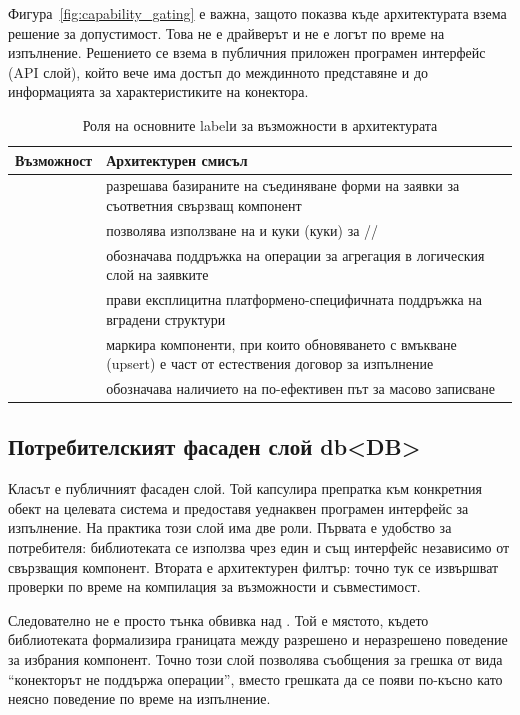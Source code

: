 Фигура~\ref{fig:capability_gating} е важна, защото показва къде архитектурата взема решение за допустимост. Това не е драйверът и не е логът по време на изпълнение. Решението се взема в публичния приложен програмен интерфейс (API слой), който вече има достъп до междинното представяне и до информацията за характеристиките на конектора.

\begin{table}[H]
\centering
\small
\caption{Роля на основните labelи за възможности в архитектурата}
\label{tab:capability_tags}
\begin{tabularx}{\textwidth}{L{3.6cm}Y}
\toprule
\textbf{Възможност} & \textbf{Архитектурен смисъл} \\
\midrule
{} & разрешава базираните на съединяване форми на заявки за съответния свързващ компонент \\
 & позволява използване на  и куки (куки) за // \\
 & обозначава поддръжка на операции за агрегация в логическия слой на заявките \\
 & прави експлицитна платформено-специфичната поддръжка на вградени структури \\
 & маркира компоненти, при които обновяването с вмъкване (upsert) е част от естествения договор за изпълнение \\
 & обозначава наличието на по-ефективен път за масово записване \\
\bottomrule
\end{tabularx}
\end{table}

\subsection{Потребителският фасаден слой db<DB>}

Класът  е публичният фасаден слой. Той капсулира препратка към конкретния обект на целевата система и предоставя уеднаквен програмен интерфейс за изпълнение. На практика този слой има две роли. Първата е удобство за потребителя: библиотеката се използва чрез един и същ интерфейс независимо от свързващия компонент. Втората е архитектурен филтър: точно тук се извършват проверки по време на компилация за възможности и съвместимост.

Следователно  не е просто тънка обвивка над . Той е мястото, където библиотеката формализира границата между разрешено и неразрешено поведение за избрания компонент. Точно този слой позволява съобщения за грешка от вида ``конекторът не поддържа  операции'', вместо грешката да се появи по-късно като неясно поведение по време на изпълнение.


